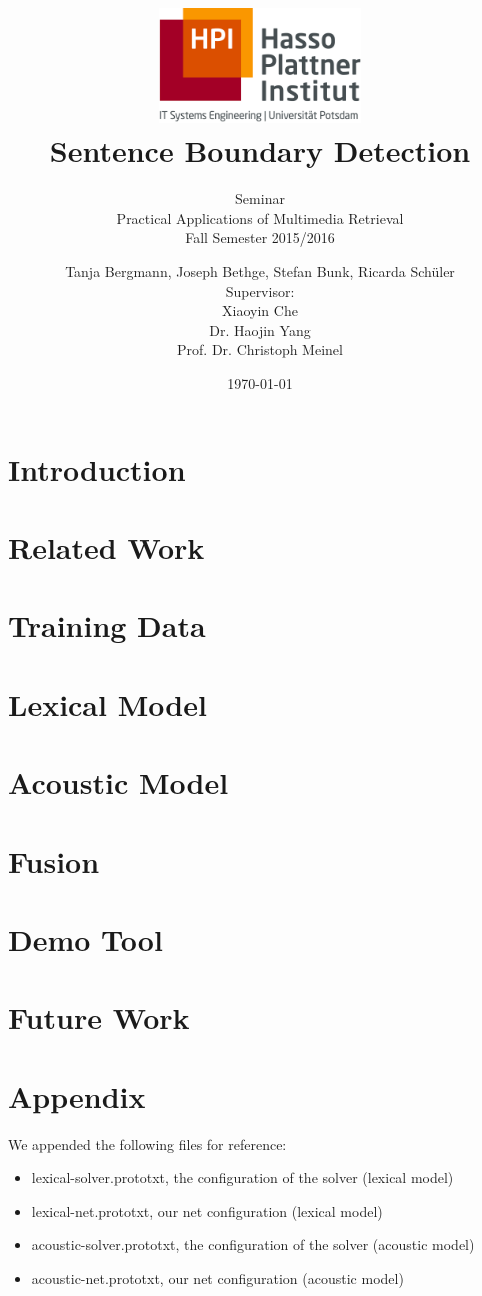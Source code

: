 \documentclass[a4paper,12pt,pagesize,headsepline,bibliography=totoc,titlepage]{scrartcl}
\title{
	\includegraphics*[width=0.4\textwidth]{img/hpi_logo.png}\\
	\vspace{24pt}
	Sentence Boundary Detection
}
\subtitle{
	Seminar\\
	Practical Applications of Multimedia Retrieval\\
	Fall Semester 2015/2016
}
\author{
	Tanja Bergmann, Joseph Bethge, Stefan Bunk, Ricarda Schüler\\[12pt]
	Supervisor:\\
    Xiaoyin Che\\
	Dr. Haojin Yang\\
	Prof. Dr. Christoph Meinel
}
\date{\today}
\begin{document}
\maketitle
\tableofcontents
\newpage

\section{Introduction}
\label{sec:introduction}


\section{Related Work}
\label{sec:related_work}


\section{Training Data}
\label{sec:training_data}


\section{Lexical Model}
\label{sec:lexical_model}


\section{Acoustic Model}
\label{sec:acoustic_model}


\section{Fusion}
\label{sec:fusion}


\section{Demo Tool}
\label{sec:demo}


\section{Future Work}
\label{sec:future}





\newpage
\appendix
\section{Appendix}
We appended the following files for reference:
\begin{itemize}
    \item lexical-solver.prototxt, the configuration of the solver (lexical model)
    \item lexical-net.prototxt, our net configuration (lexical model)
    \item acoustic-solver.prototxt, the configuration of the solver (acoustic model)
    \item acoustic-net.prototxt, our net configuration (acoustic model)
\end{itemize}
\end{document}
